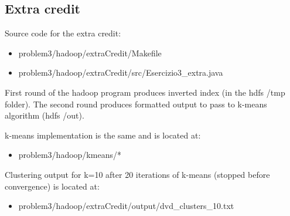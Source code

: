 \documentclass{article}
\begin{document}
\subsection{Extra credit}

Source code for the extra credit:

\begin {itemize}
    \item problem3/hadoop/extraCredit/Makefile
    \item problem3/hadoop/extraCredit/src/Esercizio3\_extra.java
\end {itemize}

First round of the hadoop program produces inverted index (in the hdfs /tmp folder). The second round produces formatted output to pass to k-means algorithm (hdfs /out).

k-means implementation is the same and is located at:

\begin {itemize}
    \item problem3/hadoop/kmeans/*
\end {itemize}

Clustering output for k=10 after 20 iterations of k-means (stopped before convergence) is located at:

\begin {itemize}
    \item problem3/hadoop/extraCredit/output/dvd\_clusters\_10.txt
\end {itemize}
\end{document}
